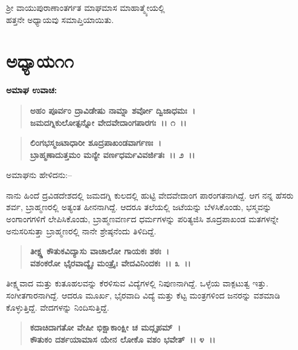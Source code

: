 \begin{center}
ಶ‍್ರೀ ವಾಯುಪುರಾಣಾಂತರ್ಗತ ಮಾಘಮಾಸ ಮಾಹಾತ್ಮ್ಯೇಯಲ್ಲಿ \\ ಹತ್ತನೇ ಅಧ್ಯಾಯವು ಸಮಾಪ್ತಿಯಾಯಿತು.
\end{center}

\newpage

\section*{ಅಧ್ಯಾಯ೧೧}

\emptypage

\begin{flushleft}
\textbf{ಅಮಾಘ ಉವಾಚ: }
\end{flushleft}

\begin{verse}
\textbf{ಅಹಂ ಪೂರ್ವಂ ದ್ರಾವಿಡೇಷು ನಾಮ್ನಾ ಶರ್ವೋ ದ್ವಿಜಾಧಮಃ~।}\\\textbf{ಜಮದಗ್ನಿಕುಲೋತ್ಪನ್ನೋ ವೇದವೇದಾಂಗಪಾರಗಃ~।। ೧~।।} 
\end{verse}

\begin{verse}
\textbf{ಲಿಂಗಭಸ್ಮಜಟಾಧಾರೀ ಶೂದ್ರಪಾಖಂಡವಾರ್ಗಣಃ~।}\\\textbf{ಬ್ರಾಹ್ಮಣಾದುತ್ತಮಂ ಮನ್ಯೇ ವರ್ಣಧರ್ಮವಿವರ್ಜಿತಃ~।। ೨~।।}
\end{verse}

\begin{flushleft}
ಅಮಾಘನು ಹೇಳಿದನು:–
\end{flushleft}

ನಾನು ಹಿಂದೆ ದ್ರವಿಡದೇಶದಲ್ಲಿ ಜಮದಗ್ನಿ ಕುಲದಲ್ಲಿ ಹುಟ್ಟಿ ವೇದವೇದಾಂಗ ಪಾರಂಗತನಾಗಿದ್ದೆ. ಆಗ ನನ್ನ ಹೆಸರು ಶರ್ವ, ಬ್ರಾಹ್ಮಣರಲ್ಲಿ ಅತ್ಯಂತ ಹೀನನಾಗಿದ್ದೆ. ಆದರೂ ತಲೆಯಲ್ಲಿ ಜಟೆಯನ್ನು ಬೆಳಸಿಕೊಂಡು, ಭಸ್ಮವನ್ನು ಅಂಗಾಂಗಗಳಿಗೆ ಲೇಪಿಸಿಕೊಂಡು, ಬ್ರಾಹ್ಮಣವರ್ಣದ ಧರ್ಮಗಳನ್ನು ಪರಿತ್ಯಜಿಸಿ ಶೂದ್ರಪಾಖಂಡ ಮತಗಳನ್ನೇ ಅನುಸರಿಸುತ್ತಾ ಬ್ರಾಹ್ಮಣರಲ್ಲಿ ನಾನೇ ಶ್ರೇಷ್ಠನೆಂದು ತಿಳಿದಿದ್ದೆ.

\begin{verse}
\textbf{ತೀಕ್ಷ್ಣ ಕೌತುಕವಿದ್ಯಾಸು ವಾಚಾಲೋ ಗಾಯಕಃ ಶಠಃ~।}\\\textbf{ವಶಂಕರೋ ಭೈರವಾದ್ಯೈಃ ಮಂತ್ರೈಃ ವೇದವಿನಿಂದಕಃ~।। ೩~।।}
\end{verse}

ತೀಕ್ಷ್ಮವಾದ ಮತ್ತು ಕುತೂಹಲವನ್ನು ಕೆರಳಿಸುವ ವಿದ್ಯೆಗಳಲ್ಲಿ ನಿಪುಣನಾಗಿದ್ದೆ. ಒಳ್ಳೆಯ ವಾಕ್ಪಟುತ್ವ ಇತ್ತು. ಸಂಗೀತಗಾರನಾಗಿದ್ದೆ. ಆದರೂ ಮೂರ್ಖ, ಭೈರವಾದಿ ವಿದ್ಯೆ ಮತ್ತು ಕೆಟ್ಟ ಮಂತ್ರಗಳಿಂದ ಜನರನ್ನು ವಶಮಾಡಿ ಕೊಳ್ಳುತ್ತಿದ್ದೆ. ವೇದಗಳನ್ನು ನಿಂದಿಸುತ್ತಿದ್ದೆ.

\begin{verse}
\textbf{ಕದಾಚಿದಾಗತೋ ವೇಷೀ ಭಿಕ್ಷಾಕಾಂಕ್ಷೀ ಚ ಮದ್ಗೃಹಮ್~।}\\\textbf{ಕೌತುಕಂ ದರ್ಶಯಾಮಾಸ ಯೇನ ಲೋಕೊ ವಶಂ ಭವೇತ್~।। ೪~।।}
\end{verse}


